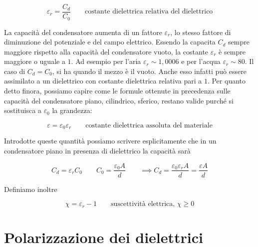 \[
	\varepsilon_r = \frac{C_d}{C_0} \qquad \text{costante dielettrica relativa del dielettrico}
\]

La capacità del condensatore aumenta di un fattore $ \varepsilon_r  $, lo stesso fattore di diminuzione del potenziale e del campo elettrico. Essendo la capacita $ C_d  $ sempre maggiore rispetto alla capacità del condensatore vuoto, la costante $ \varepsilon_r  $ è sempre maggiore o uguale a $1$. Ad esempio per l'aria $ \varepsilon_r \sim 1,0006 $ e per l'acqua $ \varepsilon_r \sim 80 $.
Il caso di $ C_d=C_0   $, si ha quando il mezzo è il vuoto. Anche esso infatti può essere assimilato a un dielettrico con costante dielettrica relativa pari a $1$. Per quanto detto finora, possiamo capire come le formule ottenute in precedenza sulle capacità del condensatore piano, cilindrico, sferico, restano valide purché si sostituisca a $ \varepsilon_0  $ la grandezza:

\[
	\varepsilon = \varepsilon_0 \varepsilon_r \qquad \text{costante dielettrica assoluta del materiale}
\]

Introdotte queste quantità possiamo scrivere esplicitamente che in un condensatore piano in presenza di dielettrico la capacità sarà

\[
	C_d=\varepsilon_r C_0 \qquad C_0=\frac{\varepsilon_0 A}{d} \qquad \implies C_d=\frac{\varepsilon_0 \varepsilon_r A}{d}=\frac{\varepsilon A}{d}
\]

Definiamo inoltre

\[
	\chi=\varepsilon_r -1 \qquad \text{suscettività elettrica, } \chi \geq 0
\]

\section{Polarizzazione dei dielettrici}

